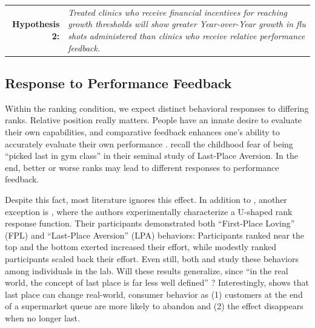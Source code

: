 \begin{onehalfspace}
 \medskip \noindent
 \begin{tabularx} {\linewidth}{ r X }
    \textbf{Hypothesis 2:} & \textit{Treated clinics who receive financial incentives for reaching growth thresholds will show greater Year-over-Year growth in flu shots administered than clinics who receive relative performance feedback.} \\
 \end{tabularx}   %
 
 \subsection{Response to Performance Feedback}
 Within the ranking condition, we expect distinct behavioral responses to differing ranks. Relative position really matters. People have an innate desire to evaluate their own capabilities, and comparative feedback enhances one’s ability to accurately evaluate their own performance \citep{Festinger1954}. \cite{Kuziemko2014} recall the childhood fear of being “picked last in gym class” in their seminal study of Last-Place Aversion. In the end, better or worse ranks may lead to different responses to performance feedback.
 
 Despite this fact, most literature ignores this effect. In addition to \cite{Kuziemko2014}, another exception is \cite{Gill2019}, where the authors experimentally characterize a U-shaped rank response function. Their participants demonstrated both “First-Place Loving” (FPL) and “Last-Place Aversion” (LPA) behaviors: Participants ranked near the top and the bottom exerted increased their effort, while modestly ranked participants scaled back their effort. Even still, both \cite{Kuziemko2014} and \cite{Gill2019} study these behaviors among individuals in the lab. Will these results generalize, since “in the real world, the concept of last place is far less well defined” \citep[][p. 107]{Kuziemko2014}? Interestingly, \cite{Buell2021} shows that last place can change real-world, consumer behavior as (1) customers at the end of a supermarket queue are more likely to abandon and (2) the effect disappears when no longer last. 
 

\end{onehalfspace}
